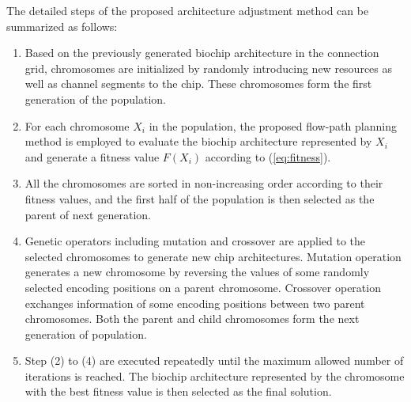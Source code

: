 The detailed steps of the proposed architecture adjustment method can be summarized as follows:
\begin{enumerate}
  \item
  Based on the previously generated biochip architecture in the connection grid, chromosomes are initialized by randomly introducing new resources as well as channel segments to the chip. These chromosomes form the first generation of the population.

  \item \label{item:iteration_begin}
  For each chromosome $X_i$ in the population, the proposed flow-path planning method is employed to evaluate the biochip architecture represented by $X_i$ and generate a fitness value $F(X_i)$ according to (\ref{eq:fitness}).

  \item
  All the chromosomes are sorted in non-increasing order according to their fitness values, and the first half of the population is then selected as the parent of next generation.

  \item \label{item:new_gen}
  Genetic operators including mutation and crossover are applied to the selected chromosomes to generate new chip architectures. Mutation operation generates a new chromosome by reversing the values of some randomly selected encoding positions on a parent chromosome. Crossover operation exchanges information of some encoding positions between two parent chromosomes. Both the parent and child chromosomes form the next generation of population.

  \item
  Step (2) to (4) are executed repeatedly  until the maximum allowed number of iterations is reached. The biochip architecture represented by the chromosome with the best fitness value is then selected as the final solution.
\end{enumerate}








